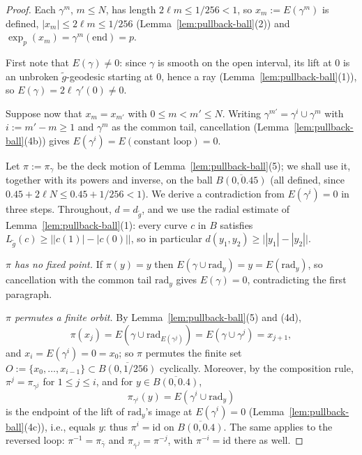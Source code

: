 \begin{proof}
\sketch
{}
Each $\gamma^m$, $m\le N$, has length $2\ell m\le1/256<1$, so
$x_m:=E(\gamma^m)$ is defined, $|x_m|\le2\ell m\le1/256$
(Lemma~\ref{lem:pullback-ball}(2)) and
$\exp_p(x_m)=\gamma^m(\text{end})=p$.

First note that $E(\gamma)\not=0$: since $\gamma$ is smooth on the
open interval, its lift at $0$ is an unbroken $\tilde g$-geodesic
starting at $0$, hence a ray
(Lemma~\ref{lem:pullback-ball}(1)), so
$E(\gamma)=2\ell\,\gamma'(0)\not=0$.

Suppose now that $x_m=x_{m'}$ with $0\le m<m'\le N$. Writing
$\gamma^{m'}=\gamma^{i}\cup\gamma^{m}$ with $i:=m'-m\ge 1$ and
$\gamma^m$ as the common tail, cancellation
(Lemma~\ref{lem:pullback-ball}(4b)) gives $E(\gamma^i)=E(\text{constant
loop})=0$.

Let $\pi:=\pi_\gamma$ be the deck motion of
Lemma~\ref{lem:pullback-ball}(5); we shall use it, together with
its powers and inverse, on the ball $\overline{B(0,0.45)}$ (all
defined, since $0.45+2\ell N\le0.45+1/256<1$). We derive a
contradiction from $E(\gamma^i)=0$ in three steps. Throughout,
$d=d_{\tilde g}$, and we use the radial estimate of
Lemma~\ref{lem:pullback-ball}(1): every curve $c$ in $B$ satisfies
$L_{\tilde g}(c)\ge\bigl||c(1)|-|c(0)|\bigr|$, so in particular
$d(y_1,y_2)\ge\bigl||y_1|-|y_2|\bigr|$.

\emph{$\pi$ has no fixed point.} If $\pi(y)=y$ then
$E(\gamma\cup\mathrm{rad}_y)=y=E(\mathrm{rad}_y)$, so cancellation
with the common tail $\mathrm{rad}_y$ gives $E(\gamma)=0$,
contradicting the first paragraph.

\emph{$\pi$ permutes a finite orbit.} By
Lemma~\ref{lem:pullback-ball}(5) and (4d),
$$\pi(x_j)=E\left(\gamma\cup\mathrm{rad}_{E(\gamma^j)}\right)
=E\left(\gamma\cup\gamma^j\right)=x_{j+1},$$
and $x_i=E(\gamma^i)=0=x_0$; so $\pi$ permutes the finite set
$O:=\{x_0,\ldots,x_{i-1}\}\subset\overline{B(0,1/256)}$
cyclically. Moreover, by the composition rule,
$\pi^{j}=\pi_{\gamma^{j}}$ for $1\le j\le i$, and for
$y\in\overline{B(0,0.4)}$,
$$\pi_{\gamma^i}(y)=E\left(\gamma^i\cup\mathrm{rad}_y\right)$$
is the endpoint of the lift of $\mathrm{rad}_y$'s image at
$E(\gamma^i)=0$ (Lemma~\ref{lem:pullback-ball}(4c)), i.e., equals
$y$: thus $\pi^i=\mathrm{id}$ on $\overline{B(0,0.4)}$. The same
applies to the reversed loop: $\pi^{-1}=\pi_{\bar\gamma}$ and
$\pi_{\bar\gamma^{\,j}}=\pi^{-j}$, with
$\pi^{-i}=\mathrm{id}$ there as well.


\end{proof}
